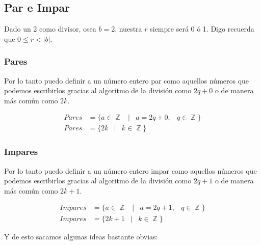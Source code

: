 \documentclass[12pt, fleqn]{report}                             %
\DeclareMathOperator \Space {\quad}                             %
\DeclareMathOperator \MiniSpace {\;}                            %
\newcommand \Such {\MiniSpace|\MiniSpace}                       %
\DeclareMathOperator \Integers  {\mathbb{Z}}                     %
\begin{document}
        \clearpage
        \subsection{Par e Impar}

            Dado un 2 como divisor, osea $b=2$, nuestra $r$ siempre será 0 ó 1.
            Digo recuerda que $0\leq r < |b|$.

            \subsubsection{Pares}
                Por lo tanto puedo definir a un número entero par como aquellos números
                que podemos escribirlos gracias al algoritmo de la división como
                $2q+0$ o de manera más común como $2k$.

                \begin{equation}
                \begin{split}
                    Pares &= \{a \in \Integers \Such a = 2q + 0, \MiniSpace q \in \Integers \}\\
                    Pares &= \{2k \Such k \in \Integers\}
                \end{split}
                \end{equation}

            \subsubsection{Impares}
                Por lo tanto puedo definir a un número entero impar como aquellos números
                que podemos escribirlos gracias al algoritmo de la división como
                $2q+1$ o de manera más común como $2k+1$.

                \begin{equation}
                \begin{split}
                    Impares &= \{a \in \Integers \Such a = 2q + 1, \MiniSpace q \in \Integers \}\\
                    Impares &= \{2k+1 \Such k \in \Integers\}
                \end{split}
                \end{equation}


            Y de esto sacamos algunas ideas bastante obvias:
\end{document}
